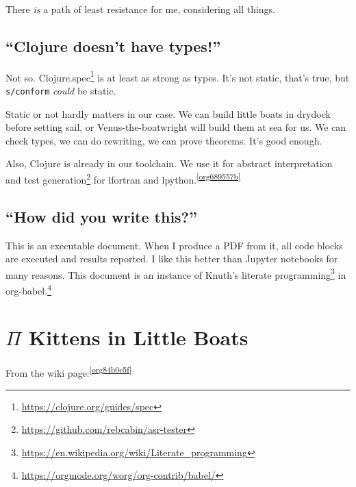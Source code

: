 \documentclass[10pt,oneside,x11names]{article}
\theoremstyle{definition}
\theoremstyle{warning}
\begin{document}
There \emph{is} a path of least resistance for me, considering all
things.

\subsection{``Clojure doesn't have types!''}
\label{sec:org3d0b0d2}

Not so. Clojure.spec\footnote{\url{https://clojure.org/guides/spec}} is at
least as strong as types. It's not static, that's true, but
\texttt{s/conform} \emph{could} be static.

Static or not hardly matters in our case. We can build little
boats in drydock before setting sail, or Venus-the-boatwright will
build them at sea for us. We can check types, we can do rewriting,
we can prove theorems. It's good enough.

Also, Clojure is already in our toolchain. We use it for abstract
interpretation and test generation\footnote{\url{https://github.com/rebcabin/asr-tester}}
for lfortran and lpython.\textsuperscript{\ref{org689557b}}

\subsection{``How did you write this?''}
\label{sec:orgc0b6a1e}

This is an executable document. When I produce a PDF from it, all
code blocks are executed and results reported. I like this better
than Jupyter notebooks for many reasons. This document
is an instance of Knuth's literate programming\footnote{\url{https://en.wikipedia.org/wiki/Literate\_programming}} in
org-babel.\footnote{\url{https://orgmode.org/worg/org-contrib/babel/}}

\newpage
\section{\(\Pi\) Kittens in Little Boats}
\label{sec:org5ebd3be}

From the wiki page:\textsuperscript{\ref{org84b0e5f}}
\end{document}
